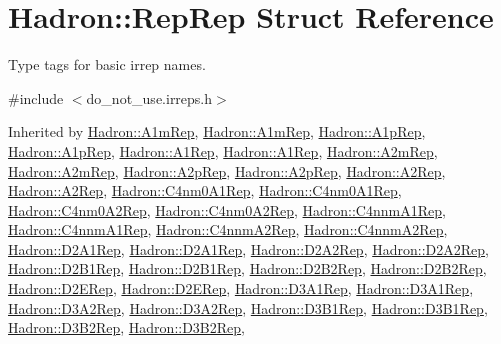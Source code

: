 \hypertarget{structHadron_1_1RepRep}{}\section{Hadron\+:\+:Rep\+Rep Struct Reference}
\label{structHadron_1_1RepRep}


Type tags for basic irrep names.  




{\ttfamily \#include $<$do\+\_\+not\+\_\+use.\+irreps.\+h$>$}



Inherited by \mbox{\hyperlink{structHadron_1_1A1mRep}{Hadron\+::\+A1m\+Rep}}, \mbox{\hyperlink{structHadron_1_1A1mRep}{Hadron\+::\+A1m\+Rep}}, \mbox{\hyperlink{structHadron_1_1A1pRep}{Hadron\+::\+A1p\+Rep}}, \mbox{\hyperlink{structHadron_1_1A1pRep}{Hadron\+::\+A1p\+Rep}}, \mbox{\hyperlink{structHadron_1_1A1Rep}{Hadron\+::\+A1\+Rep}}, \mbox{\hyperlink{structHadron_1_1A1Rep}{Hadron\+::\+A1\+Rep}}, \mbox{\hyperlink{structHadron_1_1A2mRep}{Hadron\+::\+A2m\+Rep}}, \mbox{\hyperlink{structHadron_1_1A2mRep}{Hadron\+::\+A2m\+Rep}}, \mbox{\hyperlink{structHadron_1_1A2pRep}{Hadron\+::\+A2p\+Rep}}, \mbox{\hyperlink{structHadron_1_1A2pRep}{Hadron\+::\+A2p\+Rep}}, \mbox{\hyperlink{structHadron_1_1A2Rep}{Hadron\+::\+A2\+Rep}}, \mbox{\hyperlink{structHadron_1_1A2Rep}{Hadron\+::\+A2\+Rep}}, \mbox{\hyperlink{structHadron_1_1C4nm0A1Rep}{Hadron\+::\+C4nm0\+A1\+Rep}}, \mbox{\hyperlink{structHadron_1_1C4nm0A1Rep}{Hadron\+::\+C4nm0\+A1\+Rep}}, \mbox{\hyperlink{structHadron_1_1C4nm0A2Rep}{Hadron\+::\+C4nm0\+A2\+Rep}}, \mbox{\hyperlink{structHadron_1_1C4nm0A2Rep}{Hadron\+::\+C4nm0\+A2\+Rep}}, \mbox{\hyperlink{structHadron_1_1C4nnmA1Rep}{Hadron\+::\+C4nnm\+A1\+Rep}}, \mbox{\hyperlink{structHadron_1_1C4nnmA1Rep}{Hadron\+::\+C4nnm\+A1\+Rep}}, \mbox{\hyperlink{structHadron_1_1C4nnmA2Rep}{Hadron\+::\+C4nnm\+A2\+Rep}}, \mbox{\hyperlink{structHadron_1_1C4nnmA2Rep}{Hadron\+::\+C4nnm\+A2\+Rep}}, \mbox{\hyperlink{structHadron_1_1D2A1Rep}{Hadron\+::\+D2\+A1\+Rep}}, \mbox{\hyperlink{structHadron_1_1D2A1Rep}{Hadron\+::\+D2\+A1\+Rep}}, \mbox{\hyperlink{structHadron_1_1D2A2Rep}{Hadron\+::\+D2\+A2\+Rep}}, \mbox{\hyperlink{structHadron_1_1D2A2Rep}{Hadron\+::\+D2\+A2\+Rep}}, \mbox{\hyperlink{structHadron_1_1D2B1Rep}{Hadron\+::\+D2\+B1\+Rep}}, \mbox{\hyperlink{structHadron_1_1D2B1Rep}{Hadron\+::\+D2\+B1\+Rep}}, \mbox{\hyperlink{structHadron_1_1D2B2Rep}{Hadron\+::\+D2\+B2\+Rep}}, \mbox{\hyperlink{structHadron_1_1D2B2Rep}{Hadron\+::\+D2\+B2\+Rep}}, \mbox{\hyperlink{structHadron_1_1D2ERep}{Hadron\+::\+D2\+E\+Rep}}, \mbox{\hyperlink{structHadron_1_1D2ERep}{Hadron\+::\+D2\+E\+Rep}}, \mbox{\hyperlink{structHadron_1_1D3A1Rep}{Hadron\+::\+D3\+A1\+Rep}}, \mbox{\hyperlink{structHadron_1_1D3A1Rep}{Hadron\+::\+D3\+A1\+Rep}}, \mbox{\hyperlink{structHadron_1_1D3A2Rep}{Hadron\+::\+D3\+A2\+Rep}}, \mbox{\hyperlink{structHadron_1_1D3A2Rep}{Hadron\+::\+D3\+A2\+Rep}}, \mbox{\hyperlink{structHadron_1_1D3B1Rep}{Hadron\+::\+D3\+B1\+Rep}}, \mbox{\hyperlink{structHadron_1_1D3B1Rep}{Hadron\+::\+D3\+B1\+Rep}}, \mbox{\hyperlink{structHadron_1_1D3B2Rep}{Hadron\+::\+D3\+B2\+Rep}}, \mbox{\hyperlink{structHadron_1_1D3B2Rep}{Hadron\+::\+D3\+B2\+Rep}}, 